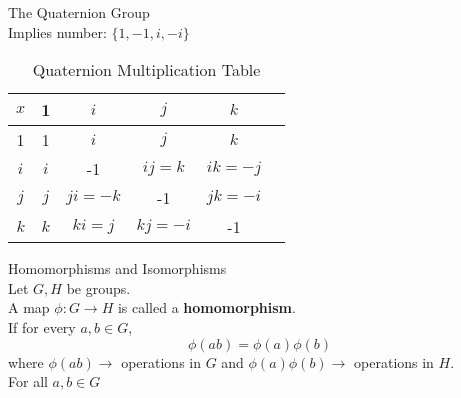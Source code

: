 \documentclass{article}
\begin{document}
 The Quaternion Group\\
Implies number: \(\{1,-1,i,-i\}\)\\
\begin{table}[h]
    \centering
    \begin{tabular}{c|c|c|c|c|c}
        $x$ & 1 & $i$ & $j$ & $k$ \\
        \hline
        1 & 1 & $i$ & $j$ & $k$ \\
        $i$ & $i$ & -1 & $ij=k$ & $ik=-j$ \\
        $j$ & $j$ & $ji=-k$ & -1 & $jk=-i$ \\
        $k$ & $k$ & $ki=j$ & $kj=-i$ & -1 \\
    \end{tabular}
    \caption{Quaternion Multiplication Table}
    \label{tab:group_operation}
\end{table}

 Homomorphisms and Isomorphisms\\
Let \(G,H\) be groups.\\
A map \(\phi:G \xrightarrow{}H\) is called a \textbf{homomorphism}.\\
If for every \(a,b \in G\), \[\phi(ab)=\phi(a)\phi(b)\] where \(\phi(ab) \xrightarrow{}\) operations in \(G\) and \(\phi(a)\phi(b) \xrightarrow{}\) operations in \(H\).\\[0.5cm]

\newpage
For all \(a,b \in G\)


\begin{center}
\end{center}
\end{document}
